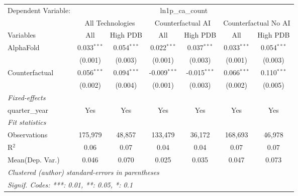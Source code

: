 \begingroup
\centering
\begin{tabular}{lcccccc}
   \tabularnewline \midrule \midrule
   Dependent Variable: & \multicolumn{6}{c}{ln1p\_ca\_count}\\
 & \multicolumn{2}{c}{All Technologies} & \multicolumn{2}{c}{Counterfactual AI} & \multicolumn{2}{c}{Counterfactual No AI} \\
\cmidrule(lr){1-1}\cmidrule(lr){2-3} \cmidrule(lr){4-5} \cmidrule(lr){6-7}
Variables & \multicolumn{1}{c}{All} & \multicolumn{1}{c}{High PDB} & \multicolumn{1}{c}{All} & \multicolumn{1}{c}{High PDB} & \multicolumn{1}{c}{All} & \multicolumn{1}{c}{High PDB} \\
\cmidrule(lr){1-1}\cmidrule(lr){2-2} \cmidrule(lr){3-3} \cmidrule(lr){4-4} \cmidrule(lr){5-5} \cmidrule(lr){6-6} \cmidrule(lr){7-7}
   AlphaFold      & 0.033$^{***}$ & 0.054$^{***}$ & 0.022$^{***}$  & 0.037$^{***}$  & 0.033$^{***}$ & 0.054$^{***}$\\   
                  & (0.001)       & (0.003)       & (0.001)        & (0.003)        & (0.001)       & (0.003)\\   
   Counterfactual & 0.056$^{***}$ & 0.094$^{***}$ & -0.009$^{***}$ & -0.015$^{***}$ & 0.066$^{***}$ & 0.110$^{***}$\\   
                  & (0.002)       & (0.004)       & (0.001)        & (0.003)        & (0.002)       & (0.005)\\   
   \midrule
   \emph{Fixed-effects}\\
   quarter\_year  & Yes           & Yes           & Yes            & Yes            & Yes           & Yes\\  
   \midrule
   \emph{Fit statistics}\\
   Observations   & 175,979       & 48,857        & 133,479        & 36,172         & 168,693       & 46,978\\  
   R$^2$          & 0.06          & 0.07          & 0.04           & 0.04           & 0.07          & 0.07\\  
Mean(Dep. Var.) & 0.046 & 0.070 & 0.025 & 0.035 & 0.047 & 0.073 \\
   \midrule \midrule
   \multicolumn{7}{l}{\emph{Clustered (author) standard-errors in parentheses}}\\
   \multicolumn{7}{l}{\emph{Signif. Codes: ***: 0.01, **: 0.05, *: 0.1}}\\
\end{tabular}
\par\endgroup
